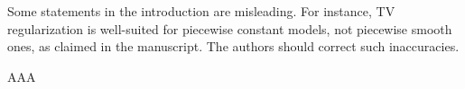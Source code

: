 \begin{point}
	Some statements in the introduction are misleading. For instance, TV regularization is well-suited for piecewise constant models, not piecewise smooth ones, as claimed in the manuscript. The authors should correct such inaccuracies.
\end{point}

\begin{reply}
	AAA
\end{reply}

